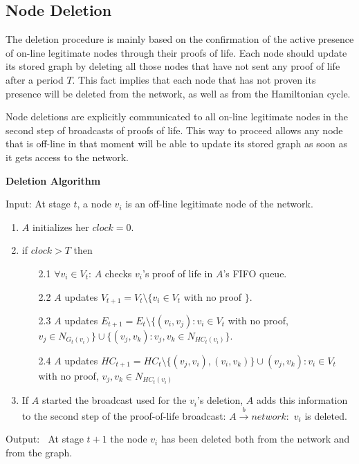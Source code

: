 \documentclass{article}
\begin{document}
\subsection{Node Deletion}


The deletion procedure is mainly based on the confirmation of the
active presence of on-line legitimate nodes through their proofs
of life. Each node should update its stored graph by deleting all
those nodes that have not sent any proof of life after a period
$T$. This fact implies that each node that has not proven its presence
will be deleted from the network, as well as from the Hamiltonian cycle.

Node deletions are explicitly communicated to all on-line
legitimate nodes in the second step of broadcasts of proofs of
life. This way to proceed allows any node that is off-line in that moment will
be able to update its stored graph as soon as it gets access to
the network.

{\bf Deletion Algorithm}


Input: At stage $t$, a node $v_i$ is an off-line legitimate node of the network.
\begin{enumerate}
    \item  $A$ initializes her $clock=0$.
    \item  if $clock > T$ then
    \begin{itemize}
    	\item [2.1]   $\forall v_i \in V_t$: $A$ checks $v_i$'s proof of life in $A$'s FIFO queue.
    	\item [2.2] $A$ updates $V_{t+1}=V_t \setminus \{v_i\in V_t$ with no proof $\}$.
    	\item [2.3] $A$ updates $E_{t+1}=E_t \setminus \{ (v_i, v_j): v_i \in V_t$
    		with no proof, $v_j \in N_{G_t(v_i)} \} \cup \{(v_j, v_k): v_j, v_k \in N_{HC_t(v_i)} \}$.
    	\item [2.4]$A$ updates $HC_{t+1}=HC_t \setminus \{(v_j, v_i), (v_i, v_k)\} \cup (v_j,v_k): v_i \in V_t$
        with no proof, $v_j, v_k \in N_{HC_t(v_i)}$
    \end{itemize}
    \item  If $A$ started the broadcast used for the $v_i$'s deletion, $A$ adds this information
    to the second step of the proof-of-life broadcast:  $A \stackrel{b}{\rightarrow} network: $ $v_i$ is deleted.
\end{enumerate}

Output: $\ $ At stage $t+1$ the node $v_i$ has been deleted both from the network and from the graph.
\end{document}

